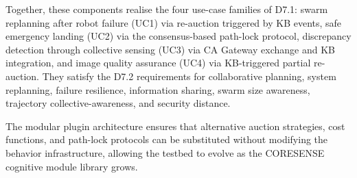 \documentclass[deliverable]{csreport}
\begin{document}
Together, these components realise the four use-case families of D7.1: swarm replanning after robot failure (UC1) via re-auction triggered by KB events, safe emergency landing (UC2) via the consensus-based path-lock protocol, discrepancy detection through collective sensing (UC3) via CA Gateway exchange and KB integration, and image quality assurance (UC4) via KB-triggered partial re-auction. They satisfy the D7.2 requirements for collaborative planning, system replanning, failure resilience, information sharing, swarm size awareness, trajectory collective-awareness, and security distance.

The modular plugin architecture ensures that alternative auction strategies, cost functions, and path-lock protocols can be substituted without modifying the behavior infrastructure, allowing the testbed to evolve as the CORESENSE cognitive module library grows.





\finalcover
\end{document}
